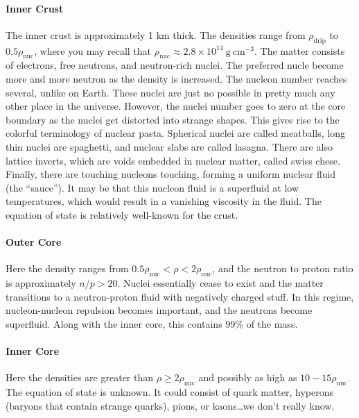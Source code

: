 \documentclass[10pt]{article}
\numberwithin{equation}{section}
\begin{document}
	\paragraph{Inner Crust} %
	\label{par:inner_crust}
	The inner crust is approximately 1 km thick. The densities range from $\rho_{\mathrm{drip}}$ to $0.5\rho_{\mathrm{nuc}}$, where you may recall that $\rho_{\mathrm{nuc}}\approx 2.8\times 10^{14}\ \mathrm{g\ cm^{-3}}$. The matter consists of electrons, free neutrons, and neutron-rich nuclei. The preferred nucle become more and more neutron as the density is increased. The nucleon number reaches several, unlike on Earth. These nuclei are just no possible in pretty much any other place in the universe. However, the nuclei number goes to zero at the core boundary as the nuclei get distorted into strange shapes. This gives rise to the colorful terminology of nuclear pasta. Spherical nuclei are called meatballs, long thin nuclei are spaghetti, and nuclear slabs are called lasagna. There are also lattice inverts, which are voids embedded in nuclear matter, called swiss chese. Finally, there are touching nucleons touching, forming a uniform nuclear fluid (the ``sauce''). It may be that this nucleon fluid is a superfluid at low temperatures, which would result in a vanishing viscosity in the fluid. The equation of state is relatively well-known for the crust.
	\paragraph{Outer Core} %
	\label{par:outer_core}
	Here the density ranges from $0.5\rho_{\mathrm{nuc}}<\rho < 2\rho_{\mathrm{nuc}}$, and the neutron to proton ratio is approximately $n/p>20$. Nuclei essentially cease to exist and the matter transitions to a neutron-proton fluid with negatively charged stuff. In this regime, nucleon-nucleon repulsion becomes important, and the neutrons become superfluid. Along with the inner core, this contains 99\% of the mass.
	\paragraph{Inner Core} %
	\label{par:inner_core}
	Here the densities are greater than $\rho\geq 2\rho_{\mathrm{nuc}}$ and possibly as high as $10-15\rho_{\mathrm{nuc}}$. The equation of state is unknown. It could consist of quark matter, hyperons (baryons that contain strange quarks), pions, or kaons\ldots we don't really know.
\end{document}
